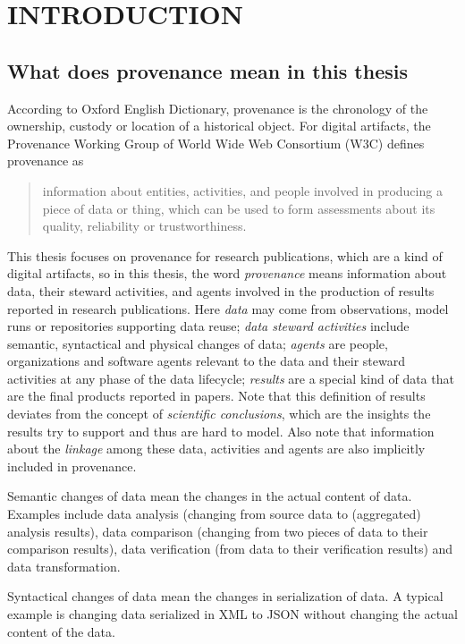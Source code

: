 \chapter{INTRODUCTION}
\label{introduction}
\section{What does provenance mean in this thesis}
According to Oxford English Dictionary, provenance is the chronology of the ownership, custody or 
location of a historical object. For digital artifacts, the Provenance Working Group of World Wide 
Web Consortium (W3C) defines provenance as \begin{quote}information about entities, activities, and 
people involved in producing a piece of data or thing, which can be used to form assessments about 
its quality, reliability or trustworthiness.\end{quote} This thesis focuses on provenance for 
research publications, which are a kind of digital artifacts, so in this thesis, the word 
\emph{provenance} means information about data, their steward activities, and agents involved in the 
production of results reported in research publications. Here \emph{data} may come from observations, 
model runs or repositories supporting data reuse; \emph{data steward activities} include semantic, 
syntactical and physical changes of data; \emph{agents} are people, organizations and software agents 
relevant to the data and their steward activities at any phase of the data lifecycle; \emph{results} 
are a special kind of data that are the final products reported in papers. Note that this definition 
of results deviates from the concept of \emph{scientific conclusions}, which are the insights the results try to support and thus are hard to model. Also note that information about the \emph{linkage} among these data, activities and agents are also implicitly included in provenance.

Semantic changes of data mean the changes in the actual content of data. Examples include data 
analysis (changing from source data to (aggregated) analysis results), data comparison (changing from 
two pieces of data to their comparison results), data verification (from data to their verification 
results) and data transformation. 

Syntactical changes of data mean the changes in serialization of data. A typical example is changing 
data serialized in XML to JSON without changing the actual content of the data.

